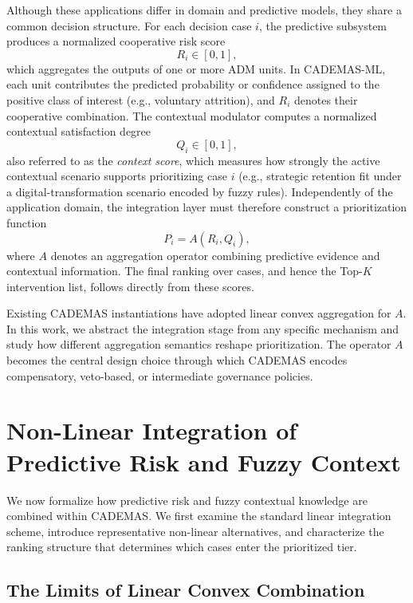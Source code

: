 \documentclass[mathematics,article,submit,moreauthors]{Definitions/mdpi}
\begin{document}
Although these applications differ in domain and predictive models, they share a common decision structure. For each decision case $i$, the predictive subsystem produces a normalized cooperative risk score
\begin{equation}
R_i \in [0,1],
\end{equation}
which aggregates the outputs of one or more ADM units. In CADEMAS-ML, each unit contributes the predicted probability or confidence assigned to the positive class of interest (e.g., voluntary attrition), and $R_i$ denotes their cooperative combination. The contextual modulator computes a normalized contextual satisfaction degree
\begin{equation}
Q_i \in [0,1],
\end{equation}
also referred to as the \emph{context score}, which measures how strongly the active contextual scenario supports prioritizing case $i$ (e.g., strategic retention fit under a digital-transformation scenario encoded by fuzzy rules). Independently of the application domain, the integration layer must therefore construct a prioritization function
\begin{equation}
P_i = A(R_i,Q_i),
\end{equation}
where $A$ denotes an aggregation operator combining predictive evidence and contextual information. The final ranking over cases, and hence the Top-$K$ intervention list, follows directly from these scores.

Existing CADEMAS instantiations have adopted linear convex aggregation for $A$. In this work, we abstract the integration stage from any specific mechanism and study how different aggregation semantics reshape prioritization. The operator $A$ becomes the central design choice through which CADEMAS encodes compensatory, veto-based, or intermediate governance policies.


\section{Non-Linear Integration of Predictive Risk and Fuzzy Context}
\label{sect:nonlinear_integration}

We now formalize how predictive risk and fuzzy contextual knowledge are combined within CADEMAS. We first examine the standard linear integration scheme, introduce representative non-linear alternatives, and characterize the ranking structure that determines which cases enter the prioritized tier.

\subsection{The Limits of Linear Convex Combination}
\label{subsect:linear_limits}
\end{document}
